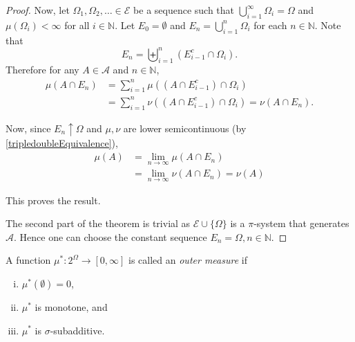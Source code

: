\begin{proof}
    Now, let $\Omega_1,\Omega_2,\ldots\in\mathcal{E}$ be a sequence such that $\bigcup_{i=1}^\infty\Omega_i=\Omega$ and $\mu(\Omega_i)<\infty$ for all $i\in\mathbb{N}$. Let $E_0=\emptyset$ and $E_n=\bigcup_{i=1}^n\Omega_i$ for each $n\in\mathbb{N}$. Note that
    $$E_n=\biguplus_{i=1}^n(E_{i-1}^c\cap \Omega_i).$$
    Therefore for any $A\in\mathcal{A}$ and $n\in\mathbb{N}$,
    \begin{align*}
        \mu(A\cap E_n) &= \sum_{i=1}^n\mu((A\cap E_{i-1}^c)\cap\Omega_i) \\
        &= \sum_{i=1}^n\nu((A\cap E_{i-1}^c)\cap\Omega_i) = \nu(A\cap E_n).
    \end{align*}
    
    Now, since $E_n\uparrow\Omega$ and $\mu,\nu$ are lower semicontinuous (by \ref{tripledoubleEquivalence}),
    \begin{align*}
        \mu(A) &= \lim_{n\to\infty}\mu(A\cap E_n) \\
        &= \lim_{n\to\infty}\nu(A\cap E_n) = \nu(A)
    \end{align*}
    
    This proves the result.
    
    \vspace{2mm}
    The second part of the theorem is trivial as $\mathcal{E}\cup\{\Omega\}$ is a $\pi$-system that generates $\mathcal{A}$. Hence one can choose the constant sequence $E_n=\Omega, n\in\mathbb{N}$.
\end{proof}

\begin{definition}
    A function $\mu^*:2^\Omega\to[0,\infty]$ is called an \textit{outer measure} if
    \begin{enumerate}[(i)]
        \item $\mu^*(\emptyset)=0$,
        \item $\mu^*$ is monotone, and
        \item $\mu^*$ is $\sigma$-subadditive.
    \end{enumerate}
\end{definition}

